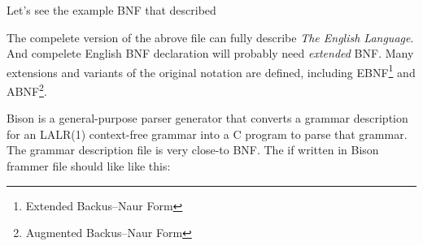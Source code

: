Let's see the example BNF that described  

The compelete version of the abrove file can fully describe \emph{The English Language}. 
And compelete English BNF declaration will probably need \emph{extended} BNF. 
Many \mbox{extensions} and variants of the original notation are defined, including EBNF\footnote{Extended Backus--Naur Form} and ABNF\footnote{Augmented Backus--Naur Form}.

Bison\cite{bison} is a general-purpose parser generator that converts a grammar description for an LALR(1) context-free grammar into a C program to parse that grammar.
The grammar description file is very close-to BNF. The    if written in Bison frammer file should like like this:

\renewcommand{\arraystretch}{1}

